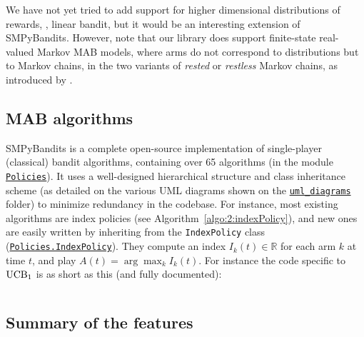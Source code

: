 We have not yet tried to add support for higher dimensional distributions of rewards, \eg, linear bandit, but it would be an interesting extension of SMPyBandits.
%
However, note that our library does support finite-state real-valued Markov MAB models, where arms do not correspond to distributions but to Markov chains, in the two variants of \emph{rested} or \emph{restless} Markov chains, as introduced by \cite{Anantharam87b}.

\subsection{MAB algorithms}

SMPyBandits is a complete open-source implementation of single-player (classical) bandit algorithms,
containing over 65 algorithms (in the module \texttt{\href{https://SMPyBandits.GitHub.io/docs/Policies.html}{Policies}}).
It uses a well-designed hierarchical structure and class inheritance scheme (as detailed on the various UML diagrams shown on the \texttt{\href{https://SMPyBandits.GitHub.io/uml_diagrams/README.html}{uml\_diagrams}} folder) to minimize redundancy in the codebase.
For instance, most existing algorithms are index policies (see Algorithm~\ref{algo:2:indexPolicy}), and new ones are easily written by inheriting from the \texttt{IndexPolicy} class (\texttt{\href{https://SMPyBandits.GitHub.io/docs/Policies.IndexPolicy.html}{Policies.IndexPolicy}}).
They compute an index $I_k(t)\in\mathbb{R}$ for each arm $k$ at time $t$, and play $A(t) = \arg\max_k I_k(t)$.
For instance the code specific to $\mathrm{UCB}_1$ is as short as this (and fully documented):

\begin{small}
    \inputminted[linenos=true,numbersep=5pt,frame=lines,framesep=2mm]{python3}{2-Chapters/3-Chapter/src/example_of_a_IndexPolicy_UCB.py}
\end{small}


\subsection{Summary of the features}

